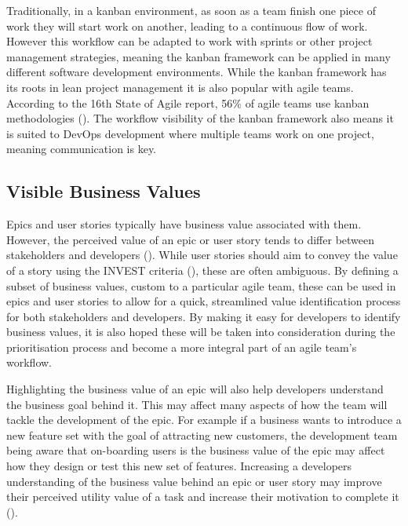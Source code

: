 \documentclass[l4proj.tex]{subfiles}
\begin{document}
Traditionally, in a kanban environment, as soon as a team finish one piece of work they will start work on another, leading to a continuous flow of work. However this workflow can be adapted to work with sprints or other project management strategies, meaning the kanban framework can be applied in many different software development environments. While the kanban framework has its roots in lean project management it is also popular with agile teams. According to the 16th State of Agile report, 56$\%$ of agile teams use kanban methodologies (\cite{StateOfAgile16}). The workflow visibility of the kanban framework also means it is suited to DevOps development where multiple teams work on one project, meaning communication is key.


\subsection{Visible Business Values}

Epics and user stories typically have business value associated with them. However, the perceived value of an epic or user story tends to differ between stakeholders and developers (\cite{Gregory2020}). While user stories should aim to convey the value of a story using the INVEST criteria (\cite{Buglione2013}), these are often ambiguous. By defining a subset of business values, custom to a particular agile team, these can be used in epics and user stories to allow for a quick, streamlined value identification process for both stakeholders and developers. By making it easy for developers to identify business values, it is also hoped these will be taken into consideration during the prioritisation process and become a more integral part of an agile team's workflow. 

Highlighting the business value of an epic will also help developers understand the business goal behind it. This may affect many aspects of how the team will tackle the development of the epic. For example if a business wants to introduce a new feature set with the goal of attracting new customers, the development team being aware that on-boarding users is the business value of the epic may affect how they design or test this new set of features. Increasing a developers understanding of the business value behind an epic or user story may improve their perceived utility value of a task and increase their motivation to complete it (\cite{Wigfield2000}). 
\end{document}
